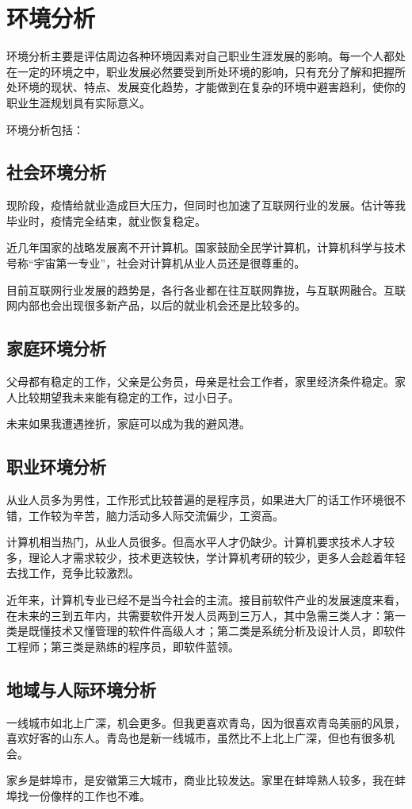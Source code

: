 \documentclass{article}
\begin{document}
\section{环境分析}
环境分析主要是评估周边各种环境因素对自己职业生涯发展的影响。每一个人都处在一定的环境之中，职业发展必然要受到所处环境的影响，只有充分了解和把握所处环境的现状、特点、发展变化趋势，才能做到在复杂的环境中避害趋利，使你的职业生涯规划具有实际意义。\par
环境分析包括：\par
\subsection{社会环境分析}
现阶段，疫情给就业造成巨大压力，但同时也加速了互联网行业的发展。估计等我毕业时，疫情完全结束，就业恢复稳定。\par
近几年国家的战略发展离不开计算机。国家鼓励全民学计算机，计算机科学与技术号称“宇宙第一专业”，社会对计算机从业人员还是很尊重的。\par
目前互联网行业发展的趋势是，各行各业都在往互联网靠拢，与互联网融合。互联网内部也会出现很多新产品，以后的就业机会还是比较多的。\par


\subsection{家庭环境分析}
父母都有稳定的工作，父亲是公务员，母亲是社会工作者，家里经济条件稳定。家人比较期望我未来能有稳定的工作，过小日子。\par
未来如果我遭遇挫折，家庭可以成为我的避风港。\par
\subsection{职业环境分析}
从业人员多为男性，工作形式比较普遍的是程序员，如果进大厂的话工作环境很不错，工作较为辛苦，脑力活动多人际交流偏少，工资高。\par
计算机相当热门，从业人员很多。但高水平人才仍缺少。计算机要求技术人才较多，理论人才需求较少，技术更迭较快，学计算机考研的较少，更多人会趁着年轻去找工作，竞争比较激烈。\par
近年来，计算机专业已经不是当今社会的主流。接目前软件产业的发展速度来看，在未来的三到五年内，共需要软件开发人员两到三万人，其中急需三类人才：第一类是既懂技术又懂管理的软件件高级人オ；第二类是系统分析及设计人员，即软件工程师；第三类是熟练的程序员，即软件蓝领。\par

\subsection{地域与人际环境分析}
一线城市如北上广深，机会更多。但我更喜欢青岛，因为很喜欢青岛美丽的风景，喜欢好客的山东人。青岛也是新一线城市，虽然比不上北上广深，但也有很多机会。\par
家乡是蚌埠市，是安徽第三大城市，商业比较发达。家里在蚌埠熟人较多，我在蚌埠找一份像样的工作也不难。\par
\end{document}
